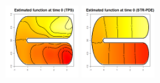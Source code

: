 \documentclass[a4paper,11pt,twoside,openright]{book}							%
\begin{document}
\begin{landscape}
\begin{figure}
\includegraphics[width=0.25\textwidth]{immagini/simulazioni/TPStempo1.png}
\includegraphics[width=0.25\textwidth]{immagini/simulazioni/STSRtempo1.png}


\end{figure}
\end{landscape}
\end{document}
